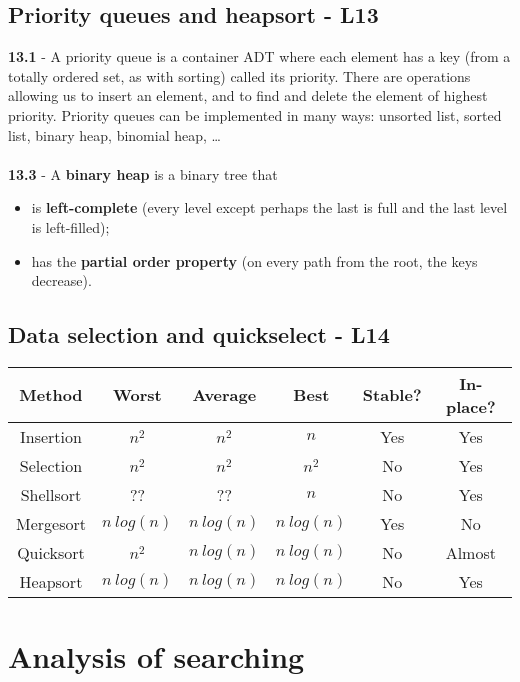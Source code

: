 \documentclass[a4paper]{article}
\begin{document}
\subsection*{Priority queues and heapsort - L13}
\textbf{13.1} - A priority queue is a container ADT where each element has a
key (from a totally ordered set, as with sorting) called its priority. There are operations
allowing us to insert an element, and to find and delete the element of
highest priority. Priority queues can be implemented
in many ways: unsorted list, sorted list, binary heap, binomial heap, \dots\\\\
\textbf{13.3} - A \textbf{binary heap} is a binary tree that
\begin{itemize}
    \item is \textbf{left-complete} (every level except perhaps the last is full and the last level
    is left-filled);
    \item has the \textbf{partial order property} (on every path from the root, the keys decrease).
\end{itemize}

\subsection*{Data selection and quickselect - L14}
\begin{center}
    \begin{tabular}{||c c c c c c||} 
    \hline
    Method & Worst & Average & Best & Stable? & In-place?  \\ [0.5ex] 
    \hline
    Insertion & $n^2$ & $n^2$ & $n$ & Yes & Yes \\ 
    \hline
    Selection & $n^2$ & $n^2$ & $n^2$ & No & Yes \\
    \hline
    Shellsort & ?? & ?? & $n$ & No & Yes \\
    \hline
    Mergesort & $n\ log(n)$ & $n\ log(n)$ & $n\ log(n)$ & Yes & No \\
    \hline
    Quicksort & $n^2$ & $n\ log(n)$ & $n\ log(n)$ & No & Almost \\ 
    \hline
    Heapsort & $n\ log(n)$ & $n\ log(n)$ & $n\ log(n)$ & No & Yes \\
    \hline
   \end{tabular}
\end{center}


\section{Analysis of searching}
\end{document}
